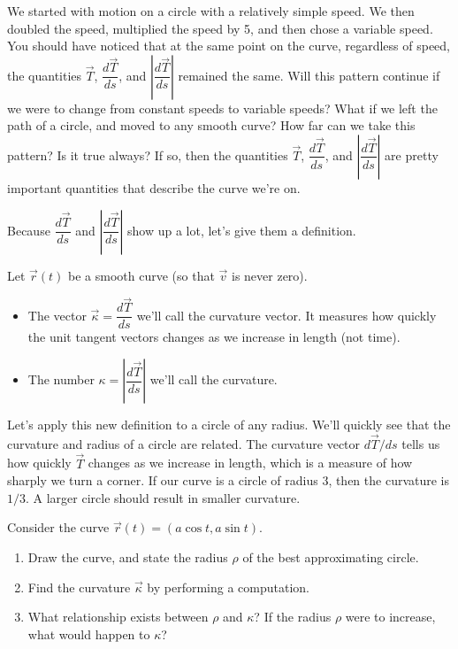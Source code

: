 
We started with motion on a circle with a relatively simple speed.  We then doubled the speed, multiplied the speed by 5, and then chose a variable speed.  You should have noticed that at the same point on the curve, regardless of speed, the quantities $\vec T$, $\dfrac{d\vec T}{ds}$, and $\left|\dfrac{d\vec T}{ds}\right|$ remained the same. Will this pattern continue if we were to change from constant speeds to variable speeds?  What if we left the path of a circle, and moved to any smooth curve? How far can we take this pattern?  Is it true always?  If so, then the quantities $\vec T$, $\dfrac{d\vec T}{ds}$, and $\left|\dfrac{d\vec T}{ds}\right|$ are pretty important quantities that describe the curve we're on. 

Because $\dfrac{d\vec T}{ds}$ and $\left|\dfrac{d\vec T}{ds}\right|$ show up a lot, let's give them a definition.
\begin{definition}
 Let $\vec r(t)$ be a smooth curve (so that $\vec v$ is never zero).
\begin{itemize}
 \item The vector $\vec \kappa = \dfrac{d\vec T}{ds}$ we'll call the curvature vector. It measures how quickly the unit tangent vectors changes as we increase in length (not time).
 \item The number $\kappa = \left|\dfrac{d\vec T}{ds}\right|$ we'll call the curvature.
\end{itemize}
\end{definition}


Let's apply this new definition to a circle of any radius.  We'll quickly see that the curvature and radius of a circle are related.
The curvature vector $d\vec T/ds$ tells us how quickly $\vec T$ changes as we increase in length, which is a measure of how sharply we turn a corner.  If our curve is a circle of radius $3$, then the curvature is $1/3$.  A larger circle should result in smaller curvature.  

\begin{problem}
 Consider the curve $\vec r(t)=(a\cos t, a\sin t)$.
 \begin{enumerate}
  \item Draw the curve, and state the radius $\rho$ of the best approximating circle.
  \item Find the curvature $\vec \kappa$ by performing a computation.
  \item What relationship exists between $\rho$ and $\kappa$?  If the radius $\rho$ were to increase, what would happen to $\kappa$?
 \end{enumerate}
\end{problem}

